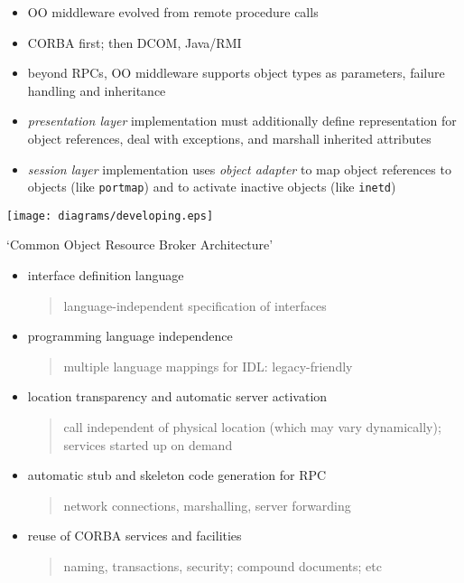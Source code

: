\documentclass{sepslide-soa-faked} %
\begin{document}
\begin{slide}
  \begin{itemize}
  \item OO middleware evolved from remote procedure calls
  \item CORBA first; then DCOM, Java/RMI
  \item beyond RPCs, OO middleware supports object types as parameters,
    failure handling and inheritance
  \item \emph{presentation layer} implementation must additionally define
    representation for object references, deal with exceptions, and
    marshall inherited attributes
  \item \emph{session layer} implementation uses \emph{object adapter} to
    map object references to objects (like \texttt{portmap}) and to
    activate inactive objects (like \texttt{inetd})
  \end{itemize}
\end{slide}

\begin{slide}
  \texttt{[image: diagrams/developing.eps]}
\end{slide}

\begin{slide}
`Common Object Resource Broker Architecture'
\begin{itemize}
\item interface definition language
  \begin{quote}
  language-independent specification of interfaces
  \end{quote}
\item programming language independence
  \begin{quote}
  multiple language mappings for IDL: legacy-friendly
  \end{quote}
\item location transparency and automatic server activation
  \begin{quote}
  call independent of physical location (which may vary dynamically);
  services started up on demand
  \end{quote}
\item automatic stub and skeleton code generation for RPC
  \begin{quote}
  network connections, marshalling, server forwarding
  \end{quote}
\item reuse of CORBA services and facilities
  \begin{quote}
  naming, %
  transactions, security; 
  compound documents;
  etc
  \end{quote}
\end{itemize}
\end{slide}
\end{document}
